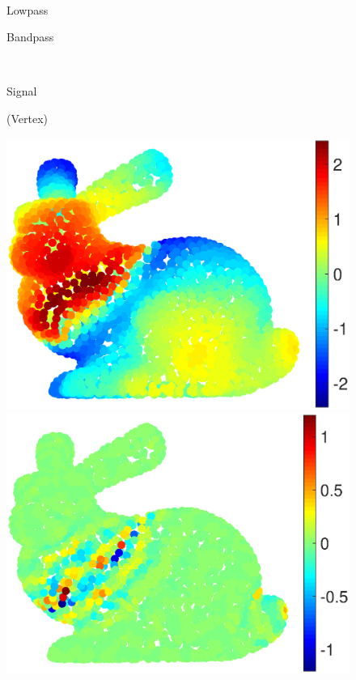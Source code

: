 \documentclass[journal, 10pt]{IEEEtran}
\begin{document}
\begin{figure}[H] 
\begin{minipage}[m]{0.16\linewidth}
~
\end{minipage}
\begin{minipage}[m]{0.4\linewidth}
\centerline{\small{Lowpass}}
\end{minipage}
\begin{minipage}[m]{0.4\linewidth}
\centerline{\small{Bandpass}}
\end{minipage} \\
\begin{minipage}[m]{0.16\linewidth}
\centerline{\small{Signal}}
\centerline{\small{(Vertex)}}
\end{minipage}
\begin{minipage}[m]{0.4\linewidth}
\centerline{\includegraphics[width=.85\linewidth]{fig_rec_low_signal}}
\end{minipage}
\begin{minipage}[m]{0.4\linewidth}
\centerline{\includegraphics[width=.85\linewidth]{fig_rec_band_signal}}

\end{minipage}
\end{figure}
\end{document}
